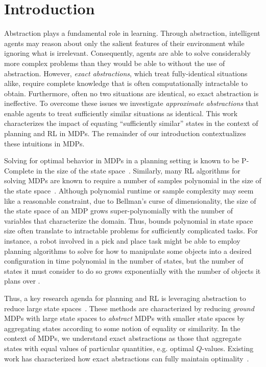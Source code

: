 \section{Introduction}
Abstraction plays a fundamental role in learning. Through abstraction, intelligent agents may reason about only the salient features of their environment while ignoring what is irrelevant. Consequently, agents are able to solve considerably more complex problems than they would be able to without the use of abstraction. However, \textit{exact abstractions}, which treat fully-identical situations alike, require complete knowledge that is often computationally intractable to obtain. Furthermore, often no two situations are identical, so exact abstraction is ineffective. To overcome these issues we investigate \textit{approximate abstractions} that enable agents to treat sufficiently similar situations as identical. This work characterizes the impact of equating ``sufficiently similar'' states in the context of planning and \ac{RL} in \acp{MDP}. The remainder of our introduction contextualizes these intuitions in \acp{MDP}.

Solving for optimal behavior in \acp{MDP} in a planning setting is known to be P-Complete in the size of the state space~\cite{papadimitriou1987complexity,littman1995complexity}. Similarly, many \ac{RL} algorithms for solving \acp{MDP} are known to require a number of samples polynomial in the size of the state space~\cite{strehl2009reinforcement}. Although polynomial runtime or sample complexity may seem like a reasonable constraint, due to Bellman's curse of dimensionality, the size of the state space of an \ac{MDP} grows super-polynomially with the number of variables that characterize the domain. Thus, bounds polynomial in state space size often translate to intractable problems for sufficiently complicated tasks.  For instance, a robot involved in a pick and place task might be able to employ planning algorithms to solve for how to manipulate some objects into a desired configuration in time polynomial in the number of states, but the number of states it must consider to do so grows exponentially with the number of objects it plans over .

Thus, a key research agenda for planning and \ac{RL} is leveraging abstraction to reduce large state spaces~\cite{andre2002state,jong2005state,dietterich2000hierarchical,Bean2011}. These methods are characterized by reducing \textit{ground} \acp{MDP} with large state spaces to \textit{abstract} MDPs with smaller state spaces by aggregating states according to some notion of equality or similarity. In the context of \acp{MDP}, we understand exact abstractions as those that aggregate states with equal values of particular quantities, e.g. optimal $Q$-values. Existing work has characterized how exact abstractions can fully maintain optimality~\cite{li2006towards,dean1997modelmin}. 

